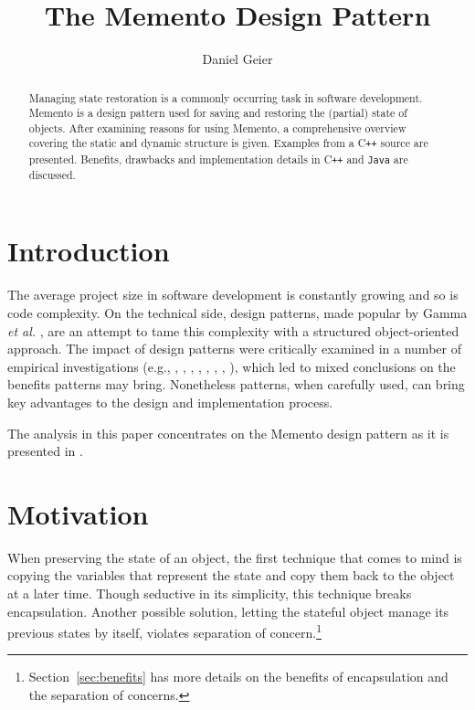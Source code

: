 \documentclass[11pt, a4paper, twoside]{article}
\title{The Memento Design Pattern}
\author{Daniel Geier}
\date{} %
\def\cpp{C{}\texttt{++}}
\begin{document}
	\maketitle

	\begin{abstract} \noindent
 		Managing state restoration is a commonly occurring task in software development. Memento is a design pattern used for saving and restoring the (partial) state of objects. After examining reasons for using Memento, a comprehensive overview covering the static and dynamic structure is given. Examples from a \cpp{} source are presented. Benefits, drawbacks and implementation details in \cpp{} and \verb|Java| are discussed.
	\end{abstract}
	
	\section{Introduction}
	\label{sec:intro}
	The average project size in software development is constantly growing and so is code complexity. On the technical side, design patterns, made popular by Gamma \textit{et al.} \cite{gamma1993design}, are an attempt to tame this complexity with a structured object-oriented approach. The impact of design patterns were critically examined in a number of empirical investigations (e.g., \cite{bieman2003design}, \cite{porras2010empirical}, \cite{jeanmart2009impact}, \cite{khomh2008design}, \cite{di2008empirical}, \cite{prechelt2001controlled}, \cite{vokac2004defect}, \cite{vokavc2004controlled}), which led to mixed conclusions on the benefits patterns may bring. Nonetheless patterns, when carefully used, can bring key advantages to the design and implementation process.
	
	The analysis in this paper concentrates on the Memento design pattern as it is presented in \cite{gamma1994design}.
	
	\section{Motivation}
	\label{sec:motivation}
	 When preserving the state of an object, the first technique that comes to mind is copying the variables that represent the state and copy them back to the object at a later time. Though seductive in its simplicity, this technique breaks encapsulation. Another possible solution, letting the stateful object manage its previous states by itself, violates separation of concern.\footnote{Section~\ref{sec:benefits} has more details on the benefits of encapsulation and the separation of concerns.}
	 
\end{document}
